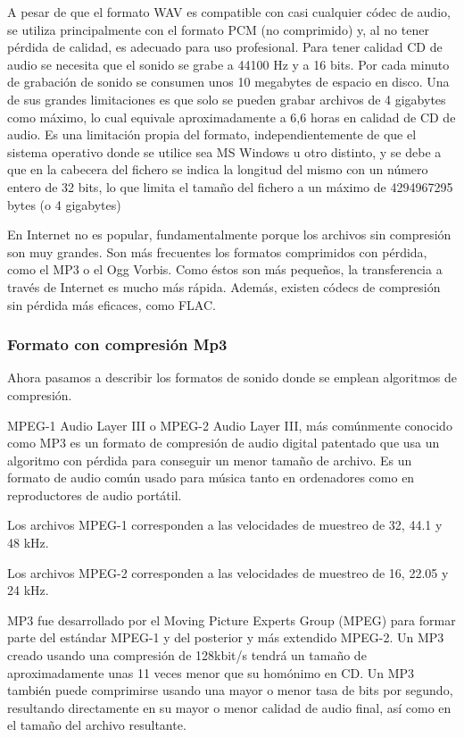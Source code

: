 \documentclass[a4paper,11pt,oneside]{book}
\begin{document}
A pesar de que el formato WAV es compatible con casi cualquier códec de audio, se utiliza principalmente con el formato PCM (no comprimido) y, al no tener pérdida de calidad, es adecuado para uso profesional. Para tener calidad CD de audio se necesita que el sonido se grabe a 44100 Hz y a 16 bits. Por cada minuto de grabación de sonido se consumen unos 10 megabytes de espacio en disco. Una de sus grandes limitaciones es que solo se pueden grabar archivos de 4 gigabytes como máximo, lo cual equivale aproximadamente a 6,6 horas en calidad de CD de audio. Es una limitación propia del formato, independientemente de que el sistema operativo donde se utilice sea MS Windows u otro distinto, y se debe a que en la cabecera del fichero se indica la longitud del mismo con un número entero de 32 bits, lo que limita el tamaño del fichero a un máximo de 4294967295 bytes (o 4 gigabytes)

En Internet no es popular, fundamentalmente porque los archivos sin compresión son muy grandes. Son más frecuentes los formatos comprimidos con pérdida, como el MP3 o el Ogg Vorbis. Como éstos son más pequeños, la transferencia a través de Internet es mucho más rápida. Además, existen códecs de compresión sin pérdida más eficaces, como FLAC.


\subsubsection{Formato con compresión Mp3}
Ahora pasamos a describir los formatos de sonido donde se emplean algoritmos de compresión. 

MPEG-1 Audio Layer III o MPEG-2 Audio Layer III, más comúnmente conocido como MP3 es un formato de compresión de audio digital patentado que usa un algoritmo con pérdida para conseguir un menor tamaño de archivo. Es un formato de audio común usado para música tanto en ordenadores como en reproductores de audio portátil.

Los archivos MPEG-1 corresponden a las velocidades de muestreo de 32, 44.1 y 48 kHz.

Los archivos MPEG-2 corresponden a las velocidades de muestreo de 16, 22.05 y 24 kHz.

MP3 fue desarrollado por el Moving Picture Experts Group (MPEG) para formar parte del estándar MPEG-1 y del posterior y más extendido MPEG-2. Un MP3 creado usando una compresión de 128kbit/s tendrá un tamaño de aproximadamente unas 11 veces menor que su homónimo en CD. Un MP3 también puede comprimirse usando una mayor o menor tasa de bits por segundo, resultando directamente en su mayor o menor calidad de audio final, así como en el tamaño del archivo resultante.
\end{document}

